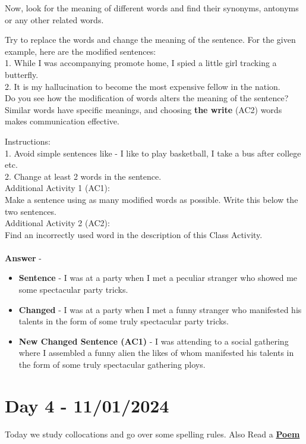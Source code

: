 \documentclass[a4paper,30pt]{report}
\begin{document}
Now, look for the meaning of different words and find their synonyms, antonyms or any other related words. 

Try to replace the words and change the meaning of the sentence. For the given example, here are the modified sentences:\\
1. While I was accompanying promote home, I spied a little girl tracking a butterfly.\\
2. It is my hallucination to become the most expensive fellow in the nation.\\

Do you see how the modification of words alters the meaning of the sentence? Similar words have specific meanings, and choosing \textbf{the write} (AC2) words makes communication effective.

Instructions: \\
1. Avoid simple sentences like - I like to play basketball, I take a bus after college etc.\\
2. Change at least 2 words in the sentence.\\

Additional Activity 1 (AC1):\\
Make a sentence using as many modified words as possible. Write this below the two sentences.\\
Additional Activity 2 (AC2):\\
Find an incorrectly used word in the description of this Class Activity. \\\\

    \textbf{Answer} - 
    \begin{itemize}
      \item  \textbf{Sentence} - I was at a party when I met a peculiar stranger who showed me some spectacular party tricks. 
      \item \textbf{Changed} -  I was at a party when I met a funny stranger who manifested his talents in the form of some truly spectacular party tricks.
      \item \textbf{New Changed Sentence (AC1)} - I was attending to a social gathering where I assembled a funny alien the likes of whom manifested his talents in the form of some truly spectacular gathering ploys. 
    \end{itemize}
  

  \chapter{Day 4 - 11/01/2024} Today we study collocations and go over some spelling rules. Also Read a \href{https://drive.google.com/file/d/1--IABOxrbkADAgSGHDRYENKqqDqNwP_j/view?usp=sharing}{\textbf{Poem}}\\
\end{document}
